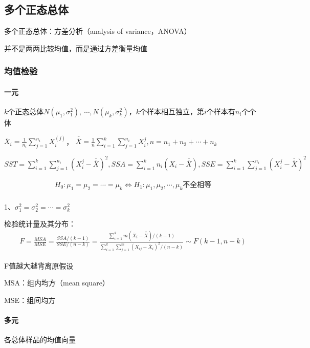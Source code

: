 \documentclass[12pt]{book}
\begin{document}
\subsection{多个正态总体}






多个正态总体：方差分析（analysis of variance，ANOVA）

并不是两两比较均值，而是通过方差衡量均值

\subsubsection{均值检验}

\paragraph{一元}
$k$个正态总体$N\left(\mu_1,\sigma_1^2\right),\ \cdots,N\left(\mu_k,\sigma_k^2\right)$，$k$个样本相互独立，第$i$个样本有$n_i$个个体

${\overline{X}}_i=\frac{1}{n_i}\sum_{j=1}^{n_i}X_i^{(j)}$，
$\overline{\overline{X}}=\frac{1}{n}\sum_{i=1}^{k}\sum_{j=1}^{n_i}{X_i^j},n=n_1+n_2+\cdots+n_k$

$
    SST=\sum_{i=1}^{k}\sum_{j=1}^{n_i}{\left(X_i^j-\overline{\overline{X}}\right)^2}, SSA=\sum_{i=1}^{k}n_i\left(X_i-\overline{\overline{X}}\right) , SSE=\sum_{i=1}^{k}\sum_{j=1}^{n_i}{\left(X_i^j-\overline{\overline{X}}\right)^2}
$

\begin{gather*}
    H_0:\mu_1=\mu_2=\cdots=\mu_k\Leftrightarrow H_1:\mu_1,\mu_2,\cdots,\mu_k\text{不全相等} \\
\end{gather*}


1、$\sigma_1^2=\sigma_2^2=\cdots=\sigma_k^2$

检验统计量及其分布：
\begin{gather*}
    F =\frac{MSA}{MSE} =\frac{SSA/(k-1)}{SSE/(n-k)} =\frac{\sum_{i=1}^{k}{m(\overline{X}_i-\overline{\overline{X}})/(k-1)}}{\sum_{i=1}^{k}\sum_{j=1}^{m}{(X_{ij}-\overline{X}_i)^2/(n-k)}} \sim F(k-1,n-k)
\end{gather*}

\par F值越大越背离原假设
\par MSA：组内均方（mean square）
\par MSE：组间均方

\paragraph{多元}
各总体样品的均值向量
\end{document}
